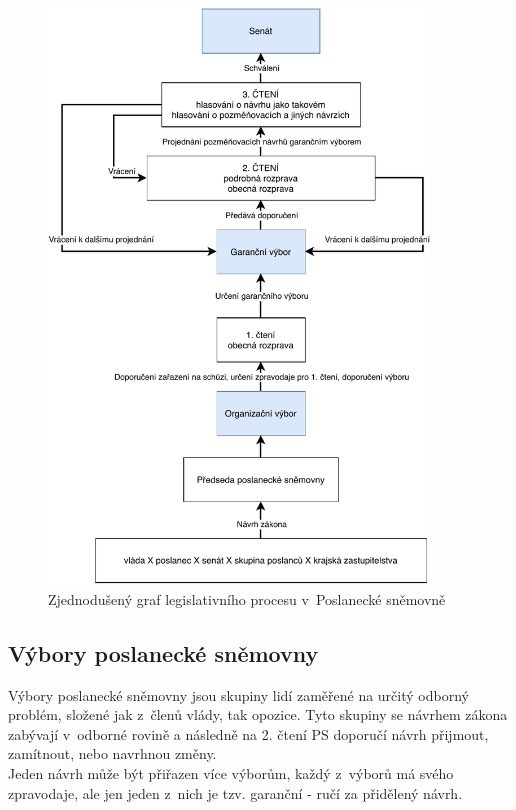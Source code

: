 \begin{figure}
    \centering
    \includegraphics[width=0.9\textwidth]{obrazky-figures/legislativni_proces_my.pdf}
    \caption{Zjednodušený graf legislativního procesu v~Poslanecké sněmovně}
    \label{fig:legislativni_proces}
\end{figure}
 
\subsection{Výbory poslanecké sněmovny}
\label{vybory}
\par Výbory poslanecké sněmovny jsou skupiny lidí zaměřené na určitý odborný problém, složené jak z~členů vlády, tak opozice. Tyto skupiny se návrhem zákona zabývají v~odborné rovině a následně na 2. čtení PS doporučí návrh přijmout, zamítnout, nebo navrhnou změny.\\
Jeden návrh může být přiřazen více výborům, každý z~výborů má svého zpravodaje, ale jen jeden z~nich je tzv. garanční - ručí za přidělený návrh. \\

